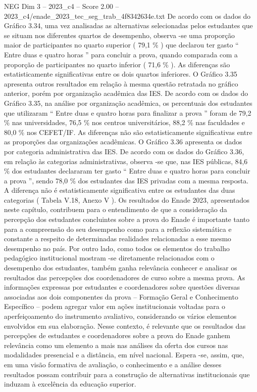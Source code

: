 \begin{textsample}{NEG Dim 3 – 2023\_c4 – Score 2.00 – 2023\_c4/enade\_2023\_tec\_seg\_trab\_4f8342634e.txt}
De acordo com os dados do Gráfico 3.34, uma vez analisadas as alternativas selecionadas pelos estudantes que se situam nos diferentes quartos de desempenho, observa -se uma proporção maior de participantes no quarto superior ( 79,1 \% ) que declarou ter gasto “ Entre duas e quatro horas ” para concluir a prova, quando comparada com a proporção de participantes no quarto inferior ( 71,6 \% ).
As diferenças são estatisticamente significativas entre os dois quartos inferiores.
O Gráfico 3.35 apresenta outros resultados em relação à mesma questão retratada no gráfico anterior, porém por organização acadêmica das IES.
De acordo com os dados do Gráfico 3.35, na análise por organização acadêmica, os percentuais dos estudantes que utilizaram “ Entre duas e quatro horas para finalizar a prova ” foram de 79,2 \% nas universidades, 76,5 \% nos centros universitários, 88,2 \% nas faculdades e 80,0 \% nos CEFET/IF.
As diferenças não são estatisticamente significativas entre as proporções das organizações acadêmicas.
O Gráfico 3.36 apresenta os dados por categoria administrativa das IES.
De acordo com os dados do Gráfico 3.36, em relação às categorias administrativas, observa -se que, nas IES públicas, 84,6 \% dos estudantes declararam ter gasto “ Entre duas e quatro horas para concluir a prova ”, sendo 78,0 \% dos estudantes das IES privadas com a mesma resposta.
A diferença não é estatisticamente significativa entre os estudantes das duas categorias ( Tabela V.18, Anexo V ).
Os resultados do Enade 2023, apresentados neste capítulo, contribuem para o entendimento de que a consideração da percepção dos estudantes concluintes sobre a prova do Enade é importante tanto para a compreensão do seu desempenho como para a reflexão sistemática e constante a respeito de determinadas realidades relacionadas a esse mesmo desempenho no país.
Por outro lado, como todos os elementos do trabalho pedagógico institucional mostram -se diretamente relacionados com o desempenho dos estudantes, também ganha relevância conhecer e analisar os resultados das percepções dos coordenadores de curso sobre a mesma prova.
As informações expressas por estudantes e coordenadores sobre questões diversas associadas aos dois componentes da prova – Formação Geral e Conhecimento Específico – podem agregar valor em ações institucionais voltadas para o aperfeiçoamento do instrumento avaliativo, considerando os vários elementos envolvidos em sua elaboração.
Nesse contexto, é relevante que os resultados das percepções de estudantes e coordenadores sobre a prova do Enade ganhem relevância como um elemento a mais nas análises da oferta dos cursos nas modalidades presencial e a distância, em nível nacional.
Espera -se, assim, que, em uma visão formativa de avaliação, o conhecimento e a análise desses resultados possam contribuir para a construção de alternativas institucionais que induzam à excelência da educação superior.

\end{textsample}
